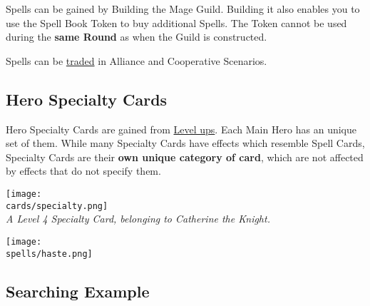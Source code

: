 \begin{multicols*}{2}
\par
Spells can be gained by Building the Mage Guild.
Building it also enables you to use the Spell Book Token to buy additional Spells.
The Token cannot be used during the \textbf{same Round} as when the Guild is constructed.\par
Spells can be \hyperlink{Trading}{traded} in Alliance and Cooperative Scenarios.

\subsection*{\hypertarget{Specialty}{Hero Specialty Cards}}

Hero Specialty Cards are gained from \hyperlink{Level}{Level ups}.
Each Main Hero has an unique set of them.
While many Specialty Cards have effects which resemble Spell Cards, Specialty Cards are their \textbf{own unique category of card}, which are not affected by effects that do not specify them.

\begin{center}
  \texttt{[image: \\cards/specialty.png]}\\
  \medskip
  \footnotesize\textit{A Level 4 Specialty Card, belonging to Catherine the Knight.}
\end{center}

\bigbreak

\begin{center}
\texttt{[image: \\spells/haste.png]}
\end{center}

\bigbreak


\filbreak

\subsection*{Searching Example}


\end{multicols*}
